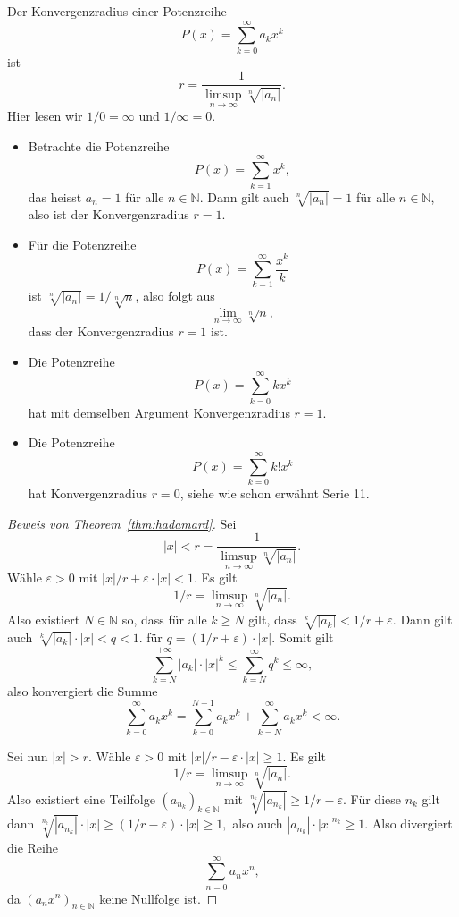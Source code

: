 \documentclass[../main.tex]{subfiles}
\begin{document}
\begin{theorem}\label{thm:hadamard}
  Der Konvergenzradius einer Potenzreihe
  \[
    P(x) = \sum_{k=0}^{\infty} a_k x^k
  \]
  ist
  \[
    r = \frac{1}{\limsup_{n \to \infty} \sqrt[n]{|a_n|}}.
  \]
  Hier lesen wir $1/0 = \infty$ und $1/\infty = 0$.
\end{theorem}

\begin{examples}
  \leavevmode
  \begin{itemize}
    \item Betrachte die Potenzreihe
      \[
        P(x) = \sum_{k=1}^{\infty} x^k,
      \]
      das heisst $a_n = 1$ für alle $n \in \mathbb{N}$.
      Dann gilt auch $\sqrt[n]{|a_n|} = 1$ für alle $n \in \mathbb{N}$,
      also ist der Konvergenzradius $r = 1$.
    \item Für die Potenzreihe
      \[
        P(x) = \sum_{k=1}^{\infty} \frac{x^k}{k}
      \]
      ist $\sqrt[n]{|a_n|} = 1/\sqrt[n]{n}$, also folgt aus
      \[
        \lim_{n \to \infty} \sqrt[n]{n},
      \]
      dass der Konvergenzradius $r = 1$ ist.
    \item Die Potenzreihe
      \[
        P(x) = \sum_{k=0}^{\infty} k x^k
      \]
      hat mit demselben Argument Konvergenzradius $r = 1$.
    \item Die Potenzreihe
      \[
        P(x) = \sum_{k=0}^{\infty} k! x^k
      \]
      hat Konvergenzradius $r = 0$, siehe wie schon erwähnt Serie 11.
  \end{itemize}
\end{examples}

\begin{proof}[Beweis von Theorem~\ref{thm:hadamard}]
  Sei \[|x| < r = \frac{1}{\limsup_{n \to \infty} \sqrt[n]{|a_n|}}.\]
  Wähle $\varepsilon > 0$ mit $|x|/r + \varepsilon \cdot |x| < 1$.
  Es gilt
  \[
    1/r = \limsup_{n \to \infty} \sqrt[n]{|a_n|}.
  \]
  Also existiert $N \in \mathbb{N}$ so,
  dass für alle $k \geq N$ gilt, dass
  \(
    \sqrt[k]{|a_k|} < 1/r + \varepsilon.
  \)
  Dann gilt auch
  \(
    \sqrt[k]{|a_k|} \cdot |x| < q < 1.
  \)
  für
  \(
    q = (1/r + \varepsilon) \cdot |x|.
  \)
  Somit gilt
  \[
    \sum_{k=N}^{+\infty} |a_k| \cdot |x|^k \leq \sum_{k=N}^{\infty} q^k \leq \infty,
  \]
  also konvergiert die Summe
  \[
    \sum_{k=0}^{\infty} a_k x^k = \sum_{k=0}^{N-1} a_k x^k + \sum_{k=N}^{\infty} a_k x^k < \infty.
  \]
  
  Sei nun $|x| > r$. Wähle $\varepsilon > 0$ mit $|x|/r - \varepsilon \cdot |x| \geq 1$.
  Es gilt
   \[
     1/r = \limsup_{n \to \infty} \sqrt[n]{|a_n|}.
  \]
  Also existiert eine Teilfolge ${(a_{n_k})}_{k \in \mathbb{N}}$ mit
  \(
    \sqrt[n_k]{|a_{n_k}|} \geq 1/r - \varepsilon.
  \)
  Für diese $n_k$ gilt dann
  \(
    \sqrt[n_k]{|a_{n_k}|} \cdot |x| \geq (1/r -\varepsilon) \cdot |x| \geq 1,
  \)
  also auch $|a_{n_k}| \cdot |x|^{n_k} \geq 1$. Also divergiert die Reihe
  \[
    \sum_{n=0}^{\infty} a_n x^n,
  \]
  da $ {(a_n x^n)}_{n \in \mathbb{N}}$ keine Nullfolge ist.
\end{proof}
\end{document}
